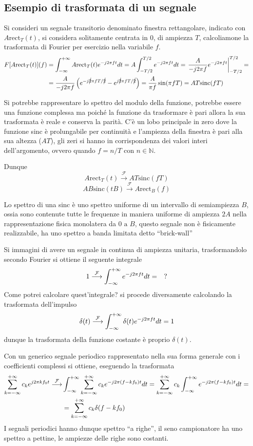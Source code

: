 \subsection{Esempio di trasformata di un segnale}
Si consideri un segnale transitorio denominato finestra rettangolare, indicato
con $A\text{rect}_T(t)$, si considera solitamente centrata in 0, di ampiezza
$T$, calcoliamone la trasformata di Fourier per esercizio nella variabile $f$.
$$\begin{aligned}
F[A\text{rect}_T(t)](f) &= \int_{-\infty}^{+\infty} A\text{rect}_T(t)e^{-j2\pi f t} dt =
A\int_{-T/2}^{T/2} e^{-j2\pi f t } dt = \left.\frac{A}{-j2\pi f}e^{-j2\pi ft
}\right|_{-T/2}^{T/2} = \\
&= \frac{A}{-j2\pi f } \left( e^{-j\cancel{2}\pi f T/\cancel{2}} -
e^{j\cancel{2}\pi f T/\cancel{2}}
\right) = \frac{A}{\pi f}\sin(\pi fT) = AT\text{sinc}(fT)
\end{aligned}$$

Si potrebbe rappresentare lo spettro del modulo della funzione, potrebbe essere
una funzione complessa ma poiché la funzione da trasformare è pari allora la
sua trasformata è reale e conserva la parità.
C'è un lobo principale in zero dove la funzione sinc è prolungabile per
continuità e l'ampiezza della finestra è pari alla sua altezza ($AT$), gli zeri
si hanno in corrispondenza dei valori interi dell'argomento, ovvero quando
$f=n/T$ con $n\in \mathbb{N}$.

Dunque
$$
A\text{rect}_T(t) \stackrel{\mathcal{F}}{\longrightarrow} AT\text{sinc}(fT)
$$
$$
AB\text{sinc}(tB) \stackrel{\mathcal{F}}{\longrightarrow} A\text{rect}_B(f)
$$


Lo spettro di una sinc è uno spettro uniforme di un intervallo di semiampiezza
$B$, ossia sono contenute tutte le frequenze in maniera uniforme di ampiezza
$2A$ nella rappresentazione fisica monolatera da $0 \text{ a } B$, questo
segnale non è fisicamente realizzabile, ha uno spettro a banda limitata detto
``brick-wall''

Si immagini di avere un segnale in continua di ampiezza unitaria,
trasformandolo secondo Fourier si ottiene il seguente integrale
$$
1 \stackrel{\mathcal{F}}{\longrightarrow}\int_{-\infty}^{+\infty} e^{-j2\pi f t} dt = \quad ?
$$
Come potrei calcolare quest'integrale? si procede diversamente calcolando la
trasformata dell'impulso
$$
\delta(t) \stackrel{\mathcal{F}}{\longrightarrow} \int_{-\infty}^{+\infty}\delta(t) e^{-j2\pi
ft}dt = 1
$$
dunque la trasformata della funzione costante è proprio $\delta(t)$.


Con un generico segnale periodico rappresentato nella sua forma generale con i
coefficienti complessi si ottiene, eseguendo la trasformata
$$\begin{aligned}
\sum_{k=-\infty}^{+\infty} c_ke ^{j2\pi k f_0 t}
\stackrel{\mathcal{F}}{\longrightarrow} &\int_{-\infty}^{+\infty}
\sum_{k=-\infty}^{+\infty} c_ke ^{-j2\pi(f -  k f_0) t} dt =
\sum_{k=-\infty}^{+\infty} c_k \int_{-\infty}^{+\infty} e^{-j 2\pi (f-kf_0)t} dt = \\
&= \sum_{k=-\infty}^{+\infty} c_k \delta(f-kf_0)
\end{aligned}$$
I segnali periodici hanno dunque spettro ``a righe'', il seno campionatore ha
uno spettro a pettine, le ampiezze delle righe sono costanti.

